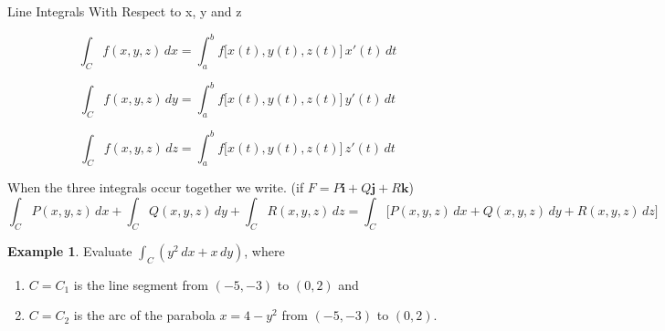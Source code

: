 \documentclass[11pt,a4paper]{article}
\theoremstyle{definition}
\newtheorem{exa}[thm]{Example}
\begin{document}
{\color[wave]{485} Line Integrals With Respect to x, y and z}


$$\int_C f(x,y,z)\,dx = \int^b_a f\big[x(t),y(t),z(t)\big]\, x'(t)\, dt$$

$$\int_C f(x,y,z)\,dy = \int^b_a f\big[x(t),y(t),z(t)\big]\, y'(t)\, dt$$

$$\int_C f(x,y,z)\,dz = \int^b_a f\big[x(t),y(t),z(t)\big] \,z'(t)\, dt$$


When the three integrals occur together we write. (if $F = P\textbf{i} + Q\textbf{j} + R\textbf{k}$)
$$\int_C P(x,y,z)\,dx + \int_C Q(x,y,z)\,dy + \int_C R(x,y,z)\,dz = \int_C\big[P(x,y,z)\,dx + Q(x,y,z)\,dy + R(x,y,z)\,dz\big]$$


\begin{exa}


Evaluate $\displaystyle{\int_C (y^2\,dx + x\,dy)}$, where

\begin{enumerate}
\item $C=C_1$ is the line segment from $(-5,-3)$ to $(0,2)$ and

\item $C = C_2$ is the arc of the parabola $x = 4-y^2$ from $(-5,-3)$ to $(0,2)$.
\end{enumerate}
\end{exa}
\end{document}

